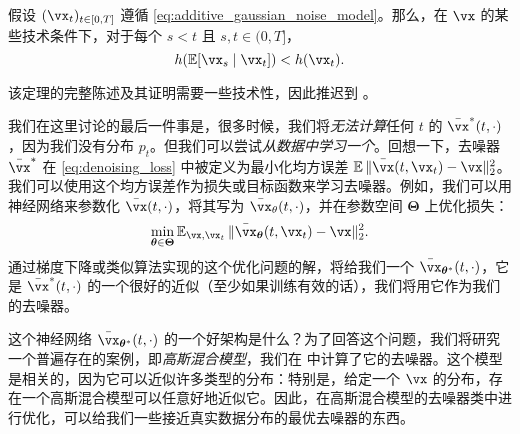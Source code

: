 \documentclass[../../book-main_zh.tex]{subfiles}
\begin{document}
\begin{theorem}
	假设 \((\vx_{t})_{t \in [0, T]}\) 遵循 \eqref{eq:additive_gaussian_noise_model}。那么，在 \(\vx\) 的某些技术条件下，对于每个 \(s < t\) 且 \(s, t \in (0, T]\)，
	\begin{equation}
		h(\Ex[\vx_{s} \mid \vx_{t}]) < h(\vx_{t}).
	\end{equation}
\end{theorem}
该定理的完整陈述及其证明需要一些技术性，因此推迟到 。

我们在这里讨论的最后一件事是，很多时候，我们将\textit{无法计算}任何 \(t\) 的 \(\bar{\vx}^{\ast}(t, \cdot)\)，因为我们没有分布 \(p_{t}\)。但我们可以尝试\textit{从数据中学习一个}。回想一下，去噪器 \(\bar{\vx}^{\ast}\) 在 \eqref{eq:denoising_loss} 中被定义为最小化均方误差 \(\Ex\norm{\bar{\vx}(t, \vx_{t}) - \vx}_{2}^{2}\)。我们可以使用这个均方误差作为损失或目标函数来学习去噪器。例如，我们可以用神经网络来参数化 \(\bar{\vx}(t, \cdot)\)，将其写为 \(\bar{\vx}_{\theta}(t, \cdot)\)，并在参数空间 \(\bm\Theta\) 上优化损失：
\begin{equation}
	\min_{\bm \theta \in \bm \Theta}\Ex_{\vx, \vx_{t}}\norm{\bar{\vx}_{\bm\theta}(t, \vx_{t}) - \vx}_{2}^{2}.
\end{equation}
通过梯度下降或类似算法实现的这个优化问题的解，将给我们一个 \(\bar{\vx}_{\bm\theta^{\ast}}(t, \cdot)\)，它是 \(\bar{\vx}^{\ast}(t, \cdot)\) 的一个很好的近似（至少如果训练有效的话），我们将用它作为我们的去噪器。

这个神经网络 \(\bar{\vx}_{\bm\theta^{\ast}}(t, \cdot)\) 的一个好架构是什么？为了回答这个问题，我们将研究一个普遍存在的案例，即\textit{高斯混合模型}，我们在  中计算了它的去噪器。这个模型是相关的，因为它可以近似许多类型的分布：特别是，给定一个 \(\vx\) 的分布，存在一个高斯混合模型可以任意好地近似它。因此，在高斯混合模型的去噪器类中进行优化，可以给我们一些接近真实数据分布的最优去噪器的东西。
\end{document}
